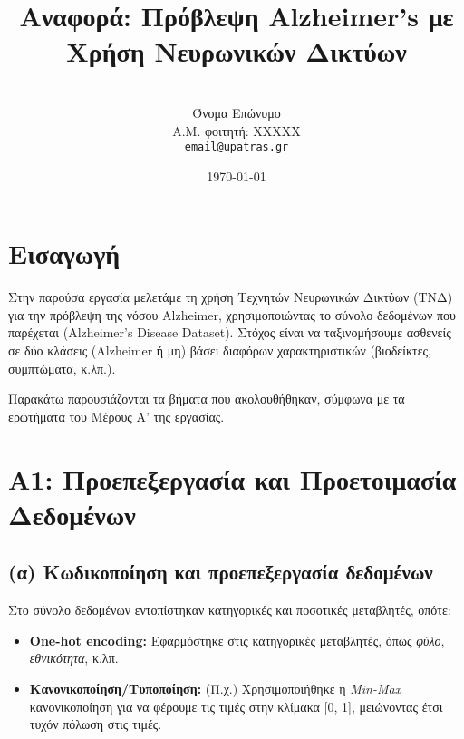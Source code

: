\documentclass[a4paper,11pt]{article}
\begin{document}

\title{\textbf{Αναφορά: Πρόβλεψη Alzheimer’s με Χρήση Νευρωνικών Δικτύων}}
\author{\\
\large Όνομα Επώνυμο \\
\large Α.Μ. φοιτητή: XXXXX \\
\large \texttt{email@upatras.gr}
}
\date{\today}
\maketitle

\section{Εισαγωγή}
Στην παρούσα εργασία μελετάμε τη χρήση Τεχνητών Νευρωνικών Δικτύων (ΤΝΔ) για την
πρόβλεψη της νόσου Alzheimer, χρησιμοποιώντας το σύνολο δεδομένων που παρέχεται
(Alzheimer’s Disease Dataset). Στόχος είναι να ταξινομήσουμε ασθενείς σε δύο κλάσεις
(Alzheimer ή μη) βάσει διαφόρων χαρακτηριστικών (βιοδείκτες, συμπτώματα, κ.λπ.).

Παρακάτω παρουσιάζονται τα βήματα που ακολουθήθηκαν, σύμφωνα με τα ερωτήματα του
Μέρους Α’ της εργασίας.

\section{A1: Προεπεξεργασία και Προετοιμασία Δεδομένων}

\subsection{(α) Κωδικοποίηση και προεπεξεργασία δεδομένων}
Στο σύνολο δεδομένων εντοπίστηκαν κατηγορικές και ποσοτικές μεταβλητές, οπότε:
\begin{itemize}
    \item \textbf{One-hot encoding:} Εφαρμόστηκε στις κατηγορικές μεταβλητές, όπως \emph{φύλο}, \emph{εθνικότητα}, κ.λπ.
    \item \textbf{Κανονικοποίηση/Τυποποίηση:} (Π.χ.) Χρησιμοποιήθηκε η \emph{Min-Max} κανονικοποίηση για να φέρουμε τις τιμές στην κλίμακα [0, 1], μειώνοντας έτσι τυχόν πόλωση στις τιμές. 
\end{itemize}
\end{document}
